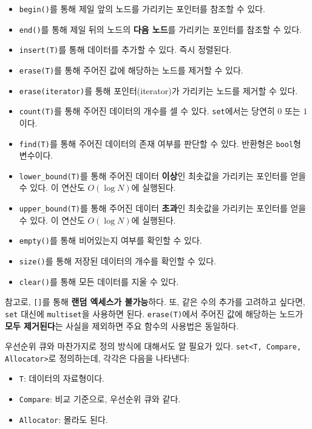 \begin{itemize}
    \item \texttt{begin()}를 통해 제일 앞의 노드를 가리키는 포인터를 참조할 수 있다.
    \item \texttt{end()}를 통해 제일 뒤의 노드의 \textbf{다음 노드}를 가리키는 포인터를 참조할 수 있다.
    \item \texttt{insert(T)}를 통해 데이터를 추가할 수 있다. 즉시 정렬된다.
    \item \texttt{erase(T)}를 통해 주어진 값에 해당하는 노드를 제거할 수 있다.
    \item \texttt{erase(iterator)}를 통해 포인터(iterator)가 가리키는 노드를 제거할 수 있다.
    \item \texttt{count(T)}를 통해 주어진 데이터의 개수를 셀 수 있다. \texttt{set}에서는 당연히 $0$ 또는 $1$이다.
    \item \texttt{find(T)}를 통해 주어진 데이터의 존재 여부를 판단할 수 있다. 반환형은 \texttt{bool}형 변수이다.
    \item \texttt{lower\_bound(T)}를 통해 주어진 데이터 \textbf{이상}인 최솟값을 가리키는 포인터를 얻을 수 있다. 이 연산도 $O(\log N)$에 실행된다.
    \item \texttt{upper\_bound(T)}를 통해 주어진 데이터 \textbf{초과}인 최솟값을 가리키는 포인터를 얻을 수 있다. 이 연산도 $O(\log N)$에 실행된다.
    \item \texttt{empty()}를 통해 비어있는지 여부를 확인할 수 있다.
    \item \texttt{size()}를 통해 저장된 데이터의 개수를 확인할 수 있다.
    \item \texttt{clear()}를 통해 모든 데이터를 지울 수 있다.
\end{itemize}

참고로, \texttt{[]}를 통해 \textbf{랜덤 엑세스가 불가능}하다. 또, 같은 수의 추가를 고려하고 싶다면, \texttt{set} 대신에 \texttt{multiset}을 사용하면 된다. \texttt{erase(T)}에서 주어진 값에 해당하는 노드가 \textbf{모두 제거된다}는 사실을 제외하면 주요 함수의 사용법은 동일하다.

우선순위 큐와 마찬가지로 정의 방식에 대해서도 알 필요가 있다. \texttt{set<T, Compare, Allocator>}로 정의하는데, 각각은 다음을 나타낸다:

\begin{itemize}
    \item \texttt{T}: 데이터의 자료형이다.
    \item \texttt{Compare}: 비교 기준으로, 우선순위 큐와 같다.
    \item \texttt{Allocator}: 몰라도 된다.
\end{itemize}

